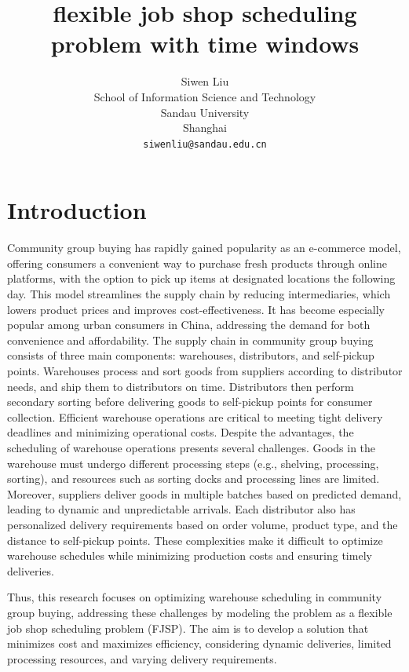 \documentclass{article}
\title{flexible job shop scheduling problem with time windows}
\author{
 Siwen Liu \\
  School of Information Science and Technology\\
  Sandau University\\
  Shanghai \\
  \texttt{siwenliu@sandau.edu.cn} \\
}
\begin{document}
\maketitle
\begin{abstract}

\end{abstract}




\section{Introduction}
Community group buying has rapidly gained popularity as an e-commerce model, offering consumers a convenient way to purchase fresh products through online platforms, with the option to pick up items at designated locations the following day. 
This model streamlines the supply chain by reducing intermediaries, which lowers product prices and improves cost-effectiveness. It has become especially popular among urban consumers in China, addressing the demand for both convenience and affordability.
The supply chain in community group buying consists of three main components: warehouses, distributors, and self-pickup points. Warehouses process and sort goods from suppliers according to distributor needs, and ship them to distributors on time. 
Distributors then perform secondary sorting before delivering goods to self-pickup points for consumer collection. 
Efficient warehouse operations are critical to meeting tight delivery deadlines and minimizing operational costs.
Despite the advantages, the scheduling of warehouse operations presents several challenges. Goods in the warehouse must undergo different processing steps (e.g., shelving, processing, sorting), and resources such as sorting docks and processing lines are limited. 
Moreover, suppliers deliver goods in multiple batches based on predicted demand, leading to dynamic and unpredictable arrivals. Each distributor also has personalized delivery requirements based on order volume,
 product type, and the distance to self-pickup points. These complexities make it difficult to optimize warehouse schedules while minimizing production costs and ensuring timely deliveries.

Thus, this research focuses on optimizing warehouse scheduling in community group buying, addressing these challenges by modeling the problem as a flexible job shop scheduling problem (FJSP). 
The aim is to develop a solution that minimizes cost and maximizes efficiency, considering dynamic deliveries, limited processing resources, and varying delivery requirements.
\end{document}
